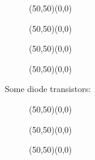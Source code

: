 	\begin{figure}[H]
		\vspace{0.5cm}
		\begin{center}
		\begin{picture}(50,50)(0,0)
		\end{picture}
		\begin{picture}(50,50)(0,0)
		\end{picture}
		\begin{picture}(50,50)(0,0)
		\end{picture}
		\begin{picture}(50,50)(0,0)
		\end{picture}
		\end{center}
	\end{figure}
	
	Some diode transistors:
	\begin{figure}[H]
		\begin{center}
		\begin{picture}(50,50)(0,0)
		\end{picture}
		\begin{picture}(50,50)(0,0)
		\end{picture}
		\begin{picture}(50,50)(0,0)
		\end{picture}
		\end{center}
	\end{figure}
	
